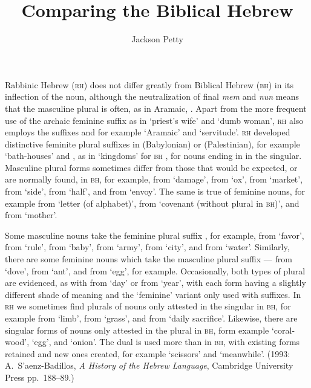 \documentclass{manuscript}
\title{Comparing the \heb{.tl} Biblical Hebrew}
\author{Jackson Petty}
\begin{document}
  \maketitle
  Rabbinic Hebrew (\textsc{rh}) does not differ greatly from Biblical Hebrew (\textsc{bh}) in its inflection of the noun, although the neutralization of final \emph{mem} and \emph{nun} means that the masculine plural is often, as in Aramaic, . Apart from the more frequent use of the archaic feminine suffix  as in  `priest's wife' and  `dumb woman', \textsc{rh} also employs the
  suffixes  and  for example  `Aramaic' and 
   `servitude'. \textsc{rh} developed distinctive feminite plural suffixes
  in  (Babylonian) or  (Palestinian), for example  `bath-houses' and , as in 
   `kingdoms' for \textsc{bh} , for nouns ending in  in the singular. Masculine plural forms sometimes differ from those that would be expected, or are normally found, in \textsc{bh}, for example,  from  `damage',  from  `ox',  from  `market',  from  `side',  from  `half', and  from  `envoy'. The same is true of feminine nouns, for example  from  `letter (of alphabet)',  from  `covenant (without plural in \textsc{bh})', and  from  `mother'.
  
  Some masculine nouns take the feminine plural suffix , for example, 
   from  `favor',  from  `rule',
   from  `baby',  from  `army',
   from  `city', and  from  `water'.
  Similarly, there are some feminine nouns which take the masculine plural suffix --- from  `dove',  from  `ant', and  from  `egg', for example. Occasionally, both
  types of plural are evidenced, as with  from  `day' or 
   from  `year', with each form having a
  slightly different shade of meaning and the `feminine' variant only used with suffixes.
  In \textsc{rh} we sometimes find plurals of nouns only attested in the singular in \textsc{bh}, for example  from  `limb', 
  from  `grass', and  from  `daily sacrifice'.
  Likewise, there are singular forms of nouns only attested in the plural in \textsc{bh},
  form example  `coral-wood',  `egg', and  `onion'. The dual is used more than in \textsc{bh}, with existing forms retained and
  new ones created, for example  `scissors' and  `meanwhile'. (1993: A.\ S'aenz-Badillos, \emph{A History of the Hebrew Language}, Cambridge University Press pp.\ 188--89.)
\end{document}
